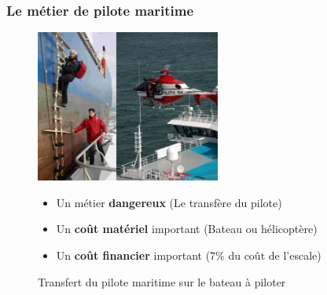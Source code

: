 \documentclass[8pt]{beamer}
\begin{document}
\begin{frame}
  \frametitle{Le métier de pilote maritime}

  \begin{figure}
    \begin{minipage}[c]{.52\linewidth}
        \centering
        \includegraphics[height=5cm]{pilotemaritime.jpg}
        \caption{Transfert du pilote maritime sur le bateau à piloter \footnotemark}
    \end{minipage}
    \hfill%
    \begin{minipage}[c]{.40\linewidth}
        \centering
        \begin{itemize}
        \item Un métier \textbf{dangereux} (Le transfère du pilote)\break
          \pause
        \item Un \textbf{coût matériel} important (Bateau ou hélicoptère)\break
          \pause
        \item Un \textbf{coût financier} important (7\% du coût de l'escale)
        \end{itemize}
    \end{minipage}
\end{figure}
  
\end{frame}
\end{document}
